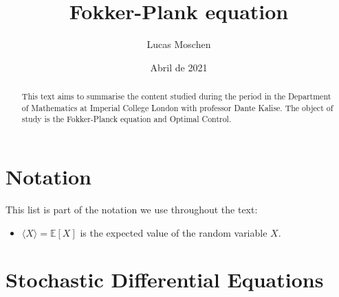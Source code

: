 \documentclass[12pt]{article}
\title{Fokker-Plank equation}
\author{Lucas Moschen}
\date{Abril de 2021}
\theoremstyle{definition}
\begin{document}
\maketitle

\onehalfspacing{}
    
\begin{abstract}
    This text aims to summarise the content studied during the period in the Department of Mathematics at Imperial College London with professor Dante Kalise.
    The object of study is the Fokker-Planck equation and Optimal Control.
\end{abstract}

\tableofcontents

\section*{Notation}

This list is part of the notation we use throughout the text:

\begin{itemize}
    \item $\langle X \rangle = \mathbb{E}[X]$ is the expected value of the random variable $X$.
\end{itemize}

\section{Stochastic Differential Equations}



\begin{thebibliography}{9}

\end{thebibliography}
\end{document}
